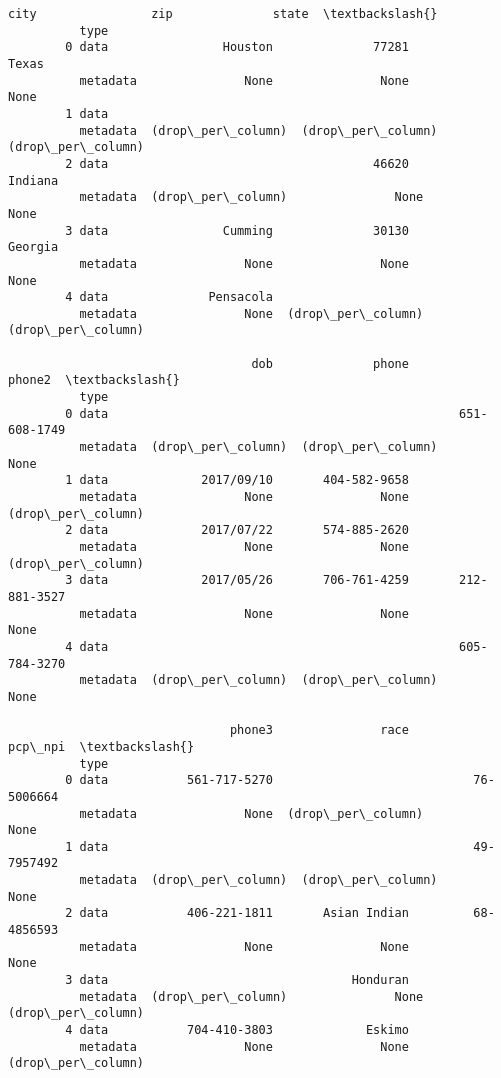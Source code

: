 \documentclass[11pt]{article}
\begin{document}
\begin{Verbatim}[commandchars=\\\{\}]
                                 city                zip              state  \textbackslash{}
          type                                                                
        0 data                Houston              77281              Texas   
          metadata               None               None               None   
        1 data                                                                
          metadata  (drop\_per\_column)  (drop\_per\_column)  (drop\_per\_column)   
        2 data                                     46620            Indiana   
          metadata  (drop\_per\_column)               None               None   
        3 data                Cumming              30130            Georgia   
          metadata               None               None               None   
        4 data              Pensacola                                         
          metadata               None  (drop\_per\_column)  (drop\_per\_column)   
        
                                  dob              phone             phone2  \textbackslash{}
          type                                                                
        0 data                                                 651-608-1749   
          metadata  (drop\_per\_column)  (drop\_per\_column)               None   
        1 data             2017/09/10       404-582-9658                      
          metadata               None               None  (drop\_per\_column)   
        2 data             2017/07/22       574-885-2620                      
          metadata               None               None  (drop\_per\_column)   
        3 data             2017/05/26       706-761-4259       212-881-3527   
          metadata               None               None               None   
        4 data                                                 605-784-3270   
          metadata  (drop\_per\_column)  (drop\_per\_column)               None   
        
                               phone3               race            pcp\_npi  \textbackslash{}
          type                                                                
        0 data           561-717-5270                            76-5006664   
          metadata               None  (drop\_per\_column)               None   
        1 data                                                   49-7957492   
          metadata  (drop\_per\_column)  (drop\_per\_column)               None   
        2 data           406-221-1811       Asian Indian         68-4856593   
          metadata               None               None               None   
        3 data                                  Honduran                      
          metadata  (drop\_per\_column)               None  (drop\_per\_column)   
        4 data           704-410-3803             Eskimo                      
          metadata               None               None  (drop\_per\_column)   
        

\end{Verbatim}
\end{document}
